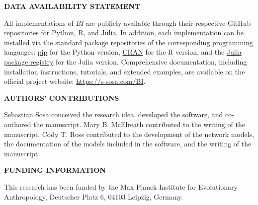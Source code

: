 \documentclass[10pt,a4paper]{letter} %
\begin{document}
\begin{letter}
\newpage
\textbf{DATA AVAILABILITY STATEMENT}

All implementations of \textit{BI} are publicly available through their respective
GitHub repositories for \href{https://github.com/BGN-for-ASNA/BI}{Python},
\href{https://github.com/BGN-for-ASNA/BIR}{R}, and
\href{https://github.com/BGN-for-ASNA/BIJ}{Julia}. In addition, each implementation
can be installed via the standard package repositories of the corresponding
programming languages: 
\href{https://pypi.org/project/BayesInference/}{pip} for the Python version, \href{https://cran.r-project.org/web/packages/BayesianInference/index.html}{CRAN} for the R
version, and the \href{https://github.com/JuliaRegistries/General/tree/master/P/PyBayesianInference}{Julia package registry} for the Julia version. Comprehensive documentation, including installation instructions, tutorials, and
extended examples, are available on the official project website:
\href{https://s-sosa.com/BI}{https://s-sosa.com/BI}.


\textbf{AUTHORS' CONTRIBUTIONS}

Sebastian Sosa conceived the research idea, developed the software, and co-authored the manuscript. Mary B. McElreath contributed to the writing of the manuscript. Cody T. Ross contributed to the development of the network models, the documentation of the models included in the software, and the writing of the manuscript.


\textbf{FUNDING INFORMATION}

This research has been funded by the Max Planck Institute for Evolutionary Anthropology, Deutscher Platz 6, 04103 Leipzig, Germany.


\end{letter}
\end{document}

